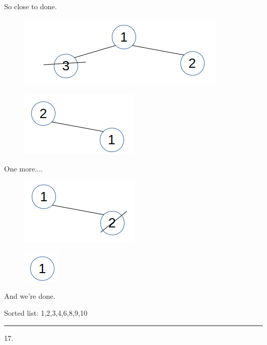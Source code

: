 \documentclass{article}
\begin{document}
So close to done. 

\begin{figure}[H]
\includegraphics[scale=0.5]{./P16/r3}
\centering
\end{figure}

\begin{figure}[H]
\includegraphics[scale=0.5]{./P16/m2}
\centering
\end{figure}

One more....

\begin{figure}[H]
\includegraphics[scale=0.5]{./P16/r2}
\centering
\end{figure}


\begin{figure}[H]
\includegraphics[scale=0.5]{./P16/m1}
\centering
\end{figure}

And we're done. 

Sorted list: 
1,2,3,4,6,8,9,10




\noindent\rule{8cm}{0.4pt}

17. 
\end{document}
